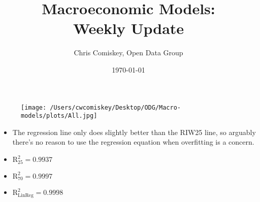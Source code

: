 \documentclass{article}
\title{Macroeconomic Models: \\ Weekly Update}
\author{Chris Comiskey, Open Data Group}
\date{\today}
\begin{document}
\maketitle{}
\begin{figure}[H]
\centering
\texttt{[image: /Users/cwcomiskey/Desktop/ODG/Macro-models/plots/All.jpg]}
\end{figure}
\begin{itemize}
\item The regression line only does slightly better than the RIW25 line, so arguably there's no reason to use the regression equation when overfitting is a concern.
\item $\text{R}^{2}_{25} = 0.9937$
\item $\text{R}^{2}_{70} = 0.9997$
\item $\text{R}^{2}_{\text{LinReg}} = 0.9998$
\end{itemize}
\end{document}
